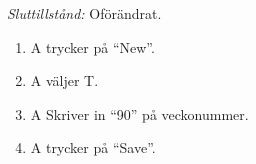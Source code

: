 \documentclass[a4paper]{article}
\begin{document}
\begin{FT}
\emph{Sluttillstånd:} Oförändrat.

\begin{enumerate}
 \item A trycker på ``New''.
 \item A väljer T.
 \item A Skriver in ``90'' på veckonummer.
 \item A trycker på ``Save''.
\end{enumerate}

% 
% 
% 
% 
% 
% 
% 
% 
% 
% 
% 
% 
% 

\end{FT}
\end{document}
